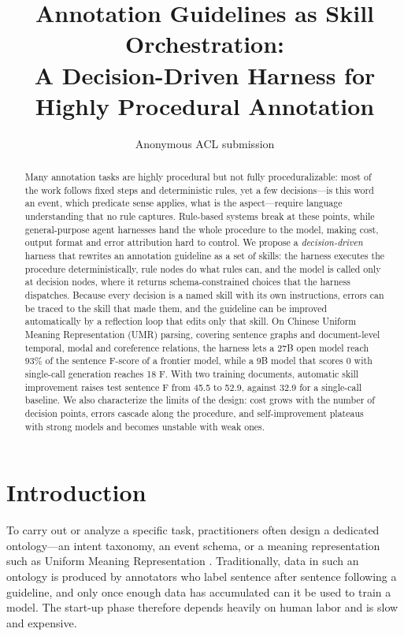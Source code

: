 \documentclass[11pt]{article}
\title{Annotation Guidelines as Skill Orchestration:\\
A Decision-Driven Harness for Highly Procedural Annotation}
\author{Anonymous ACL submission}
\newcommand{\umr}{\textsc{UMR}\xspace}
\begin{document}
\maketitle

\begin{abstract}
Many annotation tasks are highly procedural but not fully proceduralizable: most of the work follows fixed steps and deterministic rules, yet a few decisions---is this word an event, which predicate sense applies, what is the aspect---require language understanding that no rule captures. Rule-based systems break at these points, while general-purpose agent harnesses hand the whole procedure to the model, making cost, output format and error attribution hard to control. We propose a \emph{decision-driven} harness that rewrites an annotation guideline as a set of skills: the harness executes the procedure deterministically, rule nodes do what rules can, and the model is called only at decision nodes, where it returns schema-constrained choices that the harness dispatches. Because every decision is a named skill with its own instructions, errors can be traced to the skill that made them, and the guideline can be improved automatically by a reflection loop that edits only that skill. On Chinese Uniform Meaning Representation (\umr) parsing, covering sentence graphs and document-level temporal, modal and coreference relations, the harness lets a 27B open model reach 93\% of the sentence F-score of a frontier model, while a 9B model that scores 0 with single-call generation reaches 18 F. With two training documents, automatic skill improvement raises test sentence F from 45.5 to 52.9, against 32.9 for a single-call baseline. We also characterize the limits of the design: cost grows with the number of decision points, errors cascade along the procedure, and self-improvement plateaus with strong models and becomes unstable with weak ones.
\end{abstract}

\section{Introduction}

To carry out or analyze a specific task, practitioners often design a dedicated ontology---an intent taxonomy, an event schema, or a meaning representation such as Uniform Meaning Representation \citep[\umr;][]{bonn2023umr,gysel2021design}. Traditionally, data in such an ontology is produced by annotators who label sentence after sentence following a guideline, and only once enough data has accumulated can it be used to train a model. The start-up phase therefore depends heavily on human labor and is slow and expensive.
\end{document}
